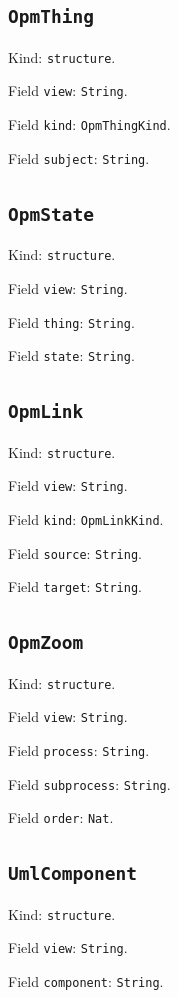 \documentclass[11pt]{article}
\begin{document}
\subsection*{\texttt{OpmThing}}
\noindent Kind: \texttt{structure}.\par
\noindent Field \texttt{view}: \texttt{String}.\par
\noindent Field \texttt{kind}: \texttt{OpmThingKind}.\par
\noindent Field \texttt{subject}: \texttt{String}.\par
\subsection*{\texttt{OpmState}}
\noindent Kind: \texttt{structure}.\par
\noindent Field \texttt{view}: \texttt{String}.\par
\noindent Field \texttt{thing}: \texttt{String}.\par
\noindent Field \texttt{state}: \texttt{String}.\par
\subsection*{\texttt{OpmLink}}
\noindent Kind: \texttt{structure}.\par
\noindent Field \texttt{view}: \texttt{String}.\par
\noindent Field \texttt{kind}: \texttt{OpmLinkKind}.\par
\noindent Field \texttt{source}: \texttt{String}.\par
\noindent Field \texttt{target}: \texttt{String}.\par
\subsection*{\texttt{OpmZoom}}
\noindent Kind: \texttt{structure}.\par
\noindent Field \texttt{view}: \texttt{String}.\par
\noindent Field \texttt{process}: \texttt{String}.\par
\noindent Field \texttt{subprocess}: \texttt{String}.\par
\noindent Field \texttt{order}: \texttt{Nat}.\par
\subsection*{\texttt{UmlComponent}}
\noindent Kind: \texttt{structure}.\par
\noindent Field \texttt{view}: \texttt{String}.\par
\noindent Field \texttt{component}: \texttt{String}.\par
\end{document}
